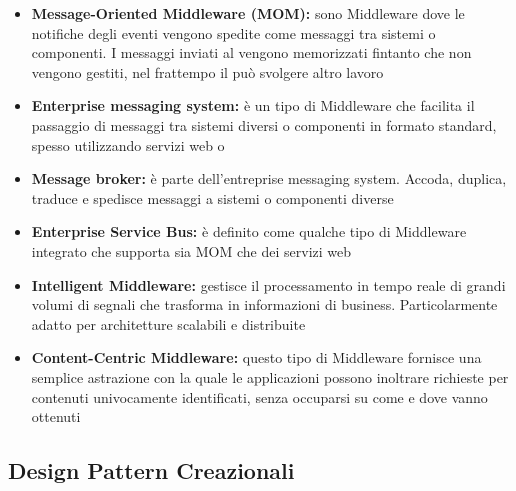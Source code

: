 \documentclass[12pt,a4paper]{article}
\begin{document}
\begin{itemize}
	\item \textbf{Message-Oriented Middleware (MOM):} sono Middleware dove le notifiche degli	eventi vengono spedite come messaggi tra sistemi o componenti. I messaggi inviati al
	 vengono memorizzati fintanto che non vengono gestiti, nel frattempo il  può	svolgere altro lavoro 
	\item \textbf{Enterprise messaging system:} è un tipo di Middleware che facilita il passaggio di messaggi tra sistemi diversi o componenti in formato standard, spesso utilizzando servizi web o 
	\item \textbf{Message broker:} è parte dell'entreprise messaging system. Accoda, duplica, traduce e spedisce messaggi a sistemi o componenti diverse
	\item \textbf{Enterprise Service Bus:} è definito come qualche tipo di Middleware integrato che supporta sia MOM che dei servizi web
	\item \textbf{Intelligent Middleware:} gestisce il processamento in tempo reale di grandi volumi di segnali che trasforma in informazioni di business. Particolarmente adatto per architetture scalabili e distribuite
	\item \textbf{Content-Centric Middleware:} questo tipo di Middleware fornisce una semplice astrazione con la quale le applicazioni possono inoltrare richieste per contenuti univocamente identificati, senza occuparsi su come e dove vanno ottenuti
\end{itemize}

\subsection{Design Pattern Creazionali}
\end{document}
